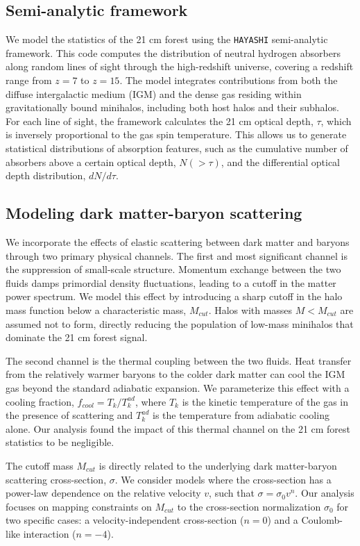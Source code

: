 \documentclass[]{article}
\begin{document}
\subsection{Semi-analytic framework}

We model the statistics of the 21 cm forest using the \texttt{HAYASHI} semi-analytic framework. This code computes the distribution of neutral hydrogen absorbers along random lines of sight through the high-redshift universe, covering a redshift range from $z=7$ to $z=15$. The model integrates contributions from both the diffuse intergalactic medium (IGM) and the dense gas residing within gravitationally bound minihalos, including both host halos and their subhalos. For each line of sight, the framework calculates the 21 cm optical depth, $\tau$, which is inversely proportional to the gas spin temperature. This allows us to generate statistical distributions of absorption features, such as the cumulative number of absorbers above a certain optical depth, $N(>\tau)$, and the differential optical depth distribution, $dN/d\tau$.

\subsection{Modeling dark matter-baryon scattering}

We incorporate the effects of elastic scattering between dark matter and baryons through two primary physical channels. The first and most significant channel is the suppression of small-scale structure. Momentum exchange between the two fluids damps primordial density fluctuations, leading to a cutoff in the matter power spectrum. We model this effect by introducing a sharp cutoff in the halo mass function below a characteristic mass, $M_{cut}$. Halos with masses $M < M_{cut}$ are assumed not to form, directly reducing the population of low-mass minihalos that dominate the 21 cm forest signal.

The second channel is the thermal coupling between the two fluids. Heat transfer from the relatively warmer baryons to the colder dark matter can cool the IGM gas beyond the standard adiabatic expansion. We parameterize this effect with a cooling fraction, $f_{cool} = T_k / T_k^{ad}$, where $T_k$ is the kinetic temperature of the gas in the presence of scattering and $T_k^{ad}$ is the temperature from adiabatic cooling alone. Our analysis found the impact of this thermal channel on the 21 cm forest statistics to be negligible.

The cutoff mass $M_{cut}$ is directly related to the underlying dark matter-baryon scattering cross-section, $\sigma$. We consider models where the cross-section has a power-law dependence on the relative velocity $v$, such that $\sigma = \sigma_0 v^n$. Our analysis focuses on mapping constraints on $M_{cut}$ to the cross-section normalization $\sigma_0$ for two specific cases: a velocity-independent cross-section ($n=0$) and a Coulomb-like interaction ($n=-4$).
\end{document}

